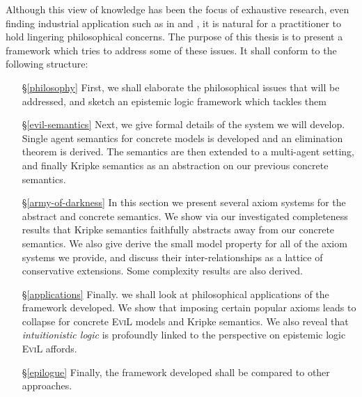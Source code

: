 \documentclass[11pt]{article}
\numberwithin{equation}{subsection}
\begin{document}
Although this view of knowledge has been the focus of exhaustive
research, even finding industrial application such as in \citet{agray_ban_2002} and
\citet{hommersom_toward_2005,hommersom_update_2004}, it is natural for
a practitioner to hold lingering philosophical concerns.  The purpose
of this thesis is to present a framework which tries to address some
of these issues.  It shall conform to the following structure:
\begin{itemize}
  \item[\S\ref{philosophy}] First, we shall elaborate the
    philosophical issues that will be addressed, and sketch an epistemic
    logic framework which tackles them
    \item[\S\ref{evil-semantics}] Next, we give formal details of the
      system we will develop.  Single agent semantics for concrete
      models is developed and an elimination theorem is derived.  
     The semantics are then extended to a multi-agent setting, 
      and finally Kripke semantics
      as an abstraction on our previous concrete semantics.
    \item[\S\ref{army-of-darkness}]In this section we present several
      axiom systems for the abstract and concrete semantics.  We show
      via our investigated completeness results that Kripke semantics
      faithfully abstracts away from our concrete semantics.  We also
      give derive the small model property for all of the axiom systems
      we provide, and discuss their inter-relationships as a lattice
      of conservative extensions.  Some complexity results are also derived. 
  \item[\S\ref{applications}]  Finally. we shall look at philosophical
    applications of the framework developed.  We show that imposing
    certain popular axioms leads to collapse for concrete
    \textsc{EviL} models and Kripke semantics. We also reveal that
    \emph{intuitionistic logic} is profoundly linked to the
    perspective on epistemic logic \textsc{EviL} affords.
  \item[\S\ref{epilogue}]  Finally, the framework developed shall be
    compared to other approaches.
\end{itemize}
\end{document}
